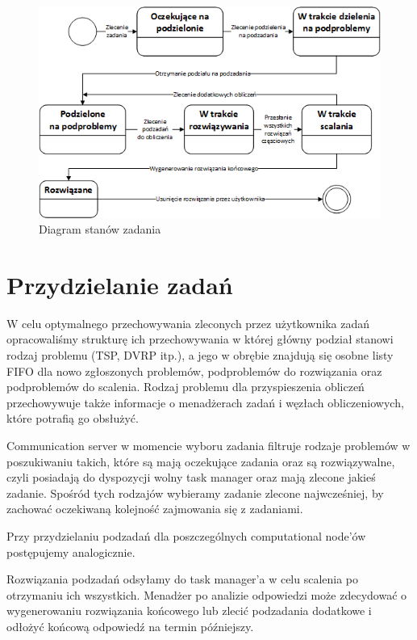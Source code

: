 \documentclass[12pt,a4paper,titlepage]{report}
\begin{document}
		\begin{figure}[h]
			\centering
			\includegraphics[width=\textwidth]{img/state/Task.png}
			\caption{Diagram stanów zadania}
		\end{figure}
		
	\section{Przydzielanie zadań}
		W celu optymalnego przechowywania zleconych przez użytkownika zadań opracowaliśmy
		strukturę ich przechowywania w której główny podział stanowi rodzaj problemu
		(TSP, DVRP itp.), a jego w obrębie znajdują się osobne listy FIFO dla nowo zgłoszonych problemów,
		podproblemów do rozwiązania oraz podproblemów do scalenia. Rodzaj problemu dla przyspieszenia obliczeń
		przechowywuje także informacje o menadżerach zadań i węzłach obliczeniowych, które potrafią
		go obsłużyć. 
		
		Communication server w momencie wyboru zadania filtruje rodzaje problemów w poszukiwaniu takich,
		które są mają oczekujące zadania oraz są rozwiązywalne, czyli posiadają do dyspozycji wolny task manager 
		oraz mają zlecone jakieś zadanie. Spośród tych rodzajów wybieramy zadanie zlecone najwcześniej, by zachować
		oczekiwaną kolejność zajmowania się z zadaniami.
		
		Przy przydzielaniu podzadań dla poszczególnych computational node'ów postępujemy analogicznie.
		
		Rozwiązania podzadań odsyłamy do task manager'a w celu scalenia po otrzymaniu ich wszystkich. Menadżer
		po analizie odpowiedzi może zdecydować o wygenerowaniu rozwiązania końcowego lub zlecić podzadania dodatkowe
		i odłożyć końcową odpowiedź na termin późniejszy. 
		
\end{document}
